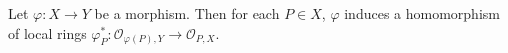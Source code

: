 Let $\varphi: X \to Y$ be a morphism. Then for each $P \in X$, $\varphi$ induces a homomorphism of local rings $\varphi_P^*: \mathcal{O}_{\varphi(P), Y} \to \mathcal{O}_{P, X}$.
